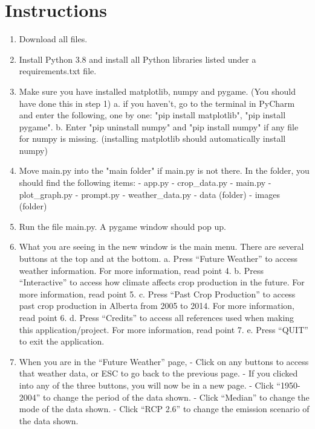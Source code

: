 \documentclass[fontsize=11pt]{article}
\begin{document}
\section*{Instructions}
\begin{enumerate}
    \item Download all files.
    \item Install Python 3.8 and install all Python libraries listed under a requirements.txt file.
    \item Make sure you have installed matplotlib, numpy and pygame. (You should have done this in step 1)
    \subitem a. if you haven't, go to the terminal in PyCharm and enter the following, one by one: "pip install matplotlib", "pip install pygame". 
    \subitem b. Enter "pip uninstall numpy" and "pip install numpy" if any file for numpy is missing. (installing matplotlib should automatically install numpy) 
    \item Move main.py into the "main folder" if main.py is not there. In the folder, you should find the following items:
    \subitem - app.py
    \subitem - crop\_data.py
    \subitem - main.py
    \subitem - plot\_graph.py
    \subitem - prompt.py
    \subitem - weather\_data.py
    \subitem - data (folder)
    \subitem - images (folder)
    \item Run the file main.py. A pygame window should pop up. 
    \item What you are seeing in the new window is the main menu. There are several buttons at the top and at the bottom.
    \subitem a. Press “Future Weather” to access weather information. For more information, read point 4.
    \subitem b. Press “Interactive” to access how climate affects crop production in the future. For more information, read point 5.
    \subitem c. Press “Past Crop Production” to access past crop production in Alberta from 2005 to 2014. For more information, read point 6.
    \subitem d. Press “Credits” to access all references used when making this application/project. For more information, read point 7.
    \subitem e. Press “QUIT” to exit the application.
    \item When you are in the “Future Weather” page,
    \subitem - Click on any buttons to access that weather data, or ESC to go back to the previous page.
    \subitem - If you clicked into any of the three buttons, you will now be in a new page.
    \subitem - Click “1950-2004” to change the period of the data shown.
    \subitem - Click “Median” to change the mode of the data shown.
    \subitem - Click “RCP 2.6” to change the emission scenario of the data shown.

\end{enumerate}
\end{document}
